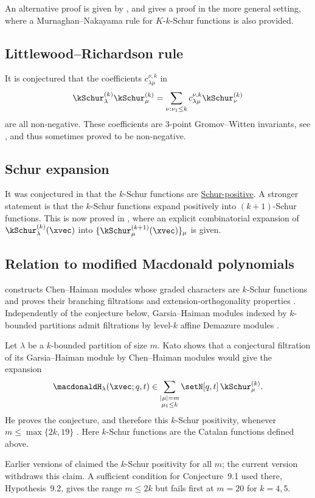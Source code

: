 An alternative proof is given by 
\cite[Thm.~10.1]{Lee2015}, and 
\cite{Nguyen2022x} gives a proof in the more general setting, where a
Murnaghan--Nakayama rule
for $K\text{-}k$-Schur functions is also provided.



\subsection[kSchurLittlewoodRichardson]{Littlewood--Richardson rule}

It is conjectured that the coefficients $c^{\nu,k}_{\lambda\mu}$ in
\[
\kSchur^{(k)}_\lambda \kSchur^{(k)}_\mu = \sum_{\nu : \nu_1 \leq k} c^{\nu,k}_{\lambda\mu} \kSchur^{(k)}_\nu
\]
are all non-negative. These coefficients are 3-point
Gromov--Witten invariants, see \cite{LapointeMorse2008},
and thus sometimes proved to be non-negative.


\subsection[kSchurSchurExpansion]{Schur expansion}

It was conjectured in \cite{LapointeMorse2007} that the $k$-Schur functions
are \hyperref[schurPositivity]{Schur-positive}.  A stronger statement is that
the $k$-Schur functions expand positively into $(k+1)$-Schur functions.
This is now proved in \cite[Thm.~2.6]{BlasiakMorseSummers2019}, where an
explicit combinatorial expansion of $\kSchur^{(k)}_\lambda(\xvec)$ into
\(\{ \kSchur^{(k+1)}_\mu(\xvec) \}_{\mu}\) is given.


\subsection[kSchurMacdonald]{Relation to modified Macdonald polynomials}

 constructs Chen--Haiman modules whose graded characters are
$k$-Schur functions and proves their branching filtrations and
extension-orthogonality properties
\cite[Thm.~4.12 and Cors.~7.5, 7.6, and~7.10]{Kato2025x}.  Independently of the
conjecture below, Garsia--Haiman modules indexed by $k$-bounded partitions
admit filtrations by level-$k$ affine Demazure modules
\cite[Cor.~10.10]{Kato2025x}.

Let $\lambda$ be a $k$-bounded partition of size $m$.  Kato shows that a
conjectural filtration of its Garsia--Haiman module by Chen--Haiman modules
\cite[Conj.~9.1 and Cor.~10.11]{Kato2025x} would give the expansion
\[
  \macdonaldH_\lambda(\xvec;q,t)
  \in
  \sum_{\substack{|\mu|=m \\ \mu_1\leq k}}
  \setN[q,t]\,\kSchur^{(k)}_\mu.
\]
He proves the conjecture, and therefore this $k$-Schur positivity, whenever
$m\leq\max\{2k,19\}$ \cite[Thm.~10.1 and Cor.~10.12]{Kato2025x}.  Here
$k$-Schur functions are the Catalan functions defined above.

\begin{remark}
Earlier versions of \cite{Kato2025x} claimed the $k$-Schur positivity for all
$m$; the current version withdraws this claim.  A sufficient condition for
Conjecture~9.1 used there, Hypothesis~9.2, gives the range $m\leq2k$ but fails
first at $m=20$ for $k=4,5$.
\end{remark}
